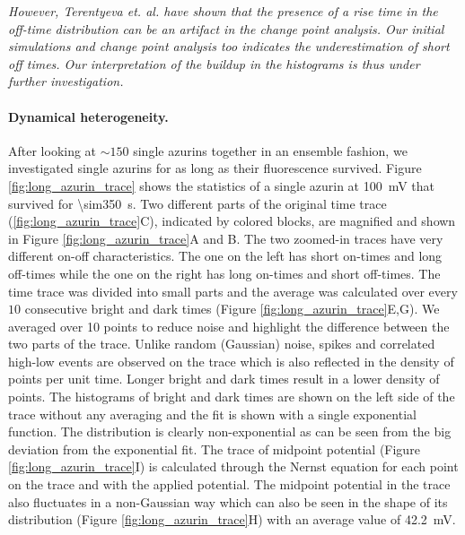 \textit{However, Terentyeva et. al. have shown that the presence of a rise time in the off-time distribution can be an artifact in the change point analysis. Our initial simulations and change point analysis too indicates the underestimation of short off times. Our interpretation of the buildup in the histograms is thus under further investigation.}
\paragraph*{Dynamical heterogeneity.}
After looking at ${\sim}150$ single azurins together in an ensemble fashion, we investigated single azurins for as long as their fluorescence survived.
Figure \ref{fig:long_azurin_trace} shows the statistics of a single azurin at \SI{100}{\mV} that survived for \SI{\sim350}{\s}.
Two different parts of the original time trace (\ref{fig:long_azurin_trace}C), indicated by colored blocks, are magnified and shown in Figure \ref{fig:long_azurin_trace}A and B.
The two zoomed-in traces have very different on-off characteristics. The one on the left has short on-times and long off-times while the one on the right has long on-times and short off-times.
The time trace was divided into small parts and the average was calculated over every $10$ consecutive bright and dark times (Figure \ref{fig:long_azurin_trace}E,G).
We averaged over 10 points to reduce noise and highlight the difference between the two parts of the trace.
Unlike random (Gaussian) noise, spikes and correlated high-low events are observed on the trace which is also reflected in the density of points per unit time. Longer bright and dark times result in a lower density of points.
The histograms of bright and dark times are shown on the left side of the trace without any averaging and the fit is shown with a single exponential function.
The distribution is clearly non-exponential as can be seen from the big deviation from the exponential fit.
The trace of midpoint potential (Figure \ref{fig:long_azurin_trace}I) is calculated through the Nernst equation for each point on the trace and with the applied potential.
The midpoint potential in the trace also fluctuates in a non-Gaussian way which can also be seen in the shape of its distribution (Figure \ref{fig:long_azurin_trace}H) with an average value of \SI{42.2}{\mV}.

